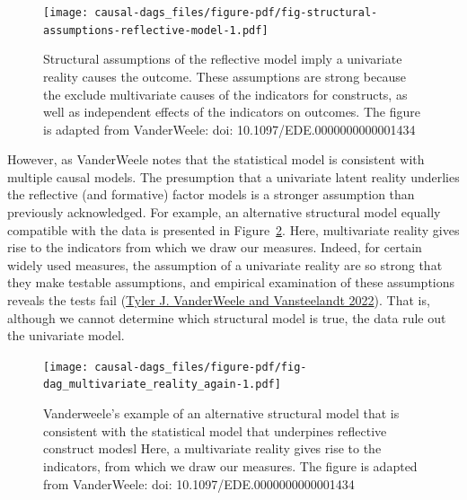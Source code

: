 \documentclass[
  singlecolumn]{report}
\begin{document}
\begin{figure}

{\centering \texttt{[image: causal-dags\_files/figure-pdf/fig-structural-assumptions-reflective-model-1.pdf]}

}

\caption{\label{fig-structural-assumptions-reflective-model}Structural
assumptions of the reflective model imply a univariate reality causes
the outcome. These assumptions are strong because the exclude
multivariate causes of the indicators for constructs, as well as
independent effects of the indicators on outcomes. The figure is adapted
from VanderWeele: doi: 10.1097/EDE.0000000000001434}

\end{figure}

However, as VanderWeele notes that the statistical model is consistent
with multiple causal models. The presumption that a univariate latent
reality underlies the reflective (and formative) factor models is a
stronger assumption than previously acknowledged. For example, an
alternative structural model equally compatible with the data is
presented in Figure~\ref{fig-dag_multivariate_reality_again}. Here,
multivariate reality gives rise to the indicators from which we draw our
measures. Indeed, for certain widely used measures, the assumption of a
univariate reality are so strong that they make testable assumptions,
and empirical examination of these assumptions reveals the tests fail
(\protect\hyperlink{ref-vanderweele2022d}{Tyler J. VanderWeele and
Vansteelandt 2022}). That is, although we cannot determine which
structural model is true, the data rule out the univariate model.

\begin{figure}

{\centering \texttt{[image: causal-dags\_files/figure-pdf/fig-dag\_multivariate\_reality\_again-1.pdf]}

}

\caption{\label{fig-dag_multivariate_reality_again}Vanderweele's example
of an alternative structural model that is consistent with the
statistical model that underpines reflective construct modesl Here, a
multivariate reality gives rise to the indicators, from which we draw
our measures. The figure is adapted from VanderWeele: doi:
10.1097/EDE.0000000000001434}

\end{figure}
\end{document}

